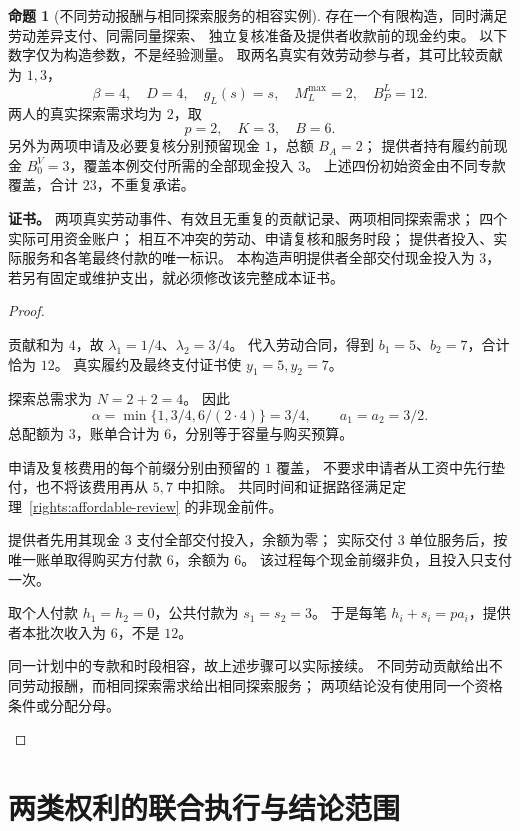 \documentclass[UTF8,12pt,a4paper,openany,fontset=none,zihao=false]{ctexrep}
\theoremstyle{definition}
\newtheorem{proposition}{命题}[chapter]
\newenvironment{certificate}{\par\noindent\textbf{证书。}\ignorespaces}{\par}
\newcommand{\1}{\mathbf 1}
\begin{document}
\begin{proposition}[不同劳动报酬与相同探索服务的相容实例]
\label{access:finite-witness}
存在一个有限构造，同时满足劳动差异支付、同需同量探索、
独立复核准备及提供者收款前的现金约束。
以下数字仅为构造参数，不是经验测量。
取两名真实有效劳动参与者，其可比较贡献为 \(1,3\)，
\[
\beta=4,\quad D=4,\quad g_L(s)=s,\quad
M_L^{\max}=2,\quad B_P^L=12.
\]
两人的真实探索需求均为 \(2\)，取
\[
p=2,\quad K=3,\quad B=6.
\]
另外为两项申请及必要复核分别预留现金 \(1\)，总额 \(B_A=2\)；
提供者持有履约前现金 \(B_0^V=3\)，覆盖本例交付所需的全部现金投入 \(3\)。
上述四份初始资金由不同专款覆盖，合计 \(23\)，不重复承诺。
\end{proposition}
\begin{certificate}
两项真实劳动事件、有效且无重复的贡献记录、两项相同探索需求；
四个实际可用资金账户；
相互不冲突的劳动、申请复核和服务时段；
提供者投入、实际服务和各笔最终付款的唯一标识。
本构造声明提供者全部交付现金投入为 \(3\)，
若另有固定或维护支出，就必须修改该完整成本证书。
\end{certificate}
\begin{proof}
\begin{semanticsteps}
\item 贡献和为 \(4\)，故
\(\lambda_1=1/4\)、\(\lambda_2=3/4\)。
代入劳动合同，得到 \(b_1=5\)、\(b_2=7\)，合计恰为 \(12\)。
真实履约及最终支付证书使 \(y_1=5,y_2=7\)。
\item 探索总需求为 \(N=2+2=4\)。
因此
\[
\alpha=\min\{1,3/4,6/(2\cdot4)\}=3/4,
\qquad a_1=a_2=3/2.
\]
总配额为 \(3\)，账单合计为 \(6\)，分别等于容量与购买预算。
\item 申请及复核费用的每个前缀分别由预留的 \(1\) 覆盖，
不要求申请者从工资中先行垫付，也不将该费用再从 \(5,7\) 中扣除。
共同时间和证据路径满足定理~\ref{rights:affordable-review} 的非现金前件。
\item 提供者先用其现金 \(3\) 支付全部交付投入，余额为零；
实际交付 \(3\) 单位服务后，按唯一账单取得购买方付款 \(6\)，余额为 \(6\)。
该过程每个现金前缀非负，且投入只支付一次。
\item 取个人付款 \(h_1=h_2=0\)，公共付款为 \(s_1=s_2=3\)。
于是每笔 \(h_i+s_i=pa_i\)，提供者本批次收入为 \(6\)，不是 \(12\)。
\item 同一计划中的专款和时段相容，故上述步骤可以实际接续。
不同劳动贡献给出不同劳动报酬，而相同探索需求给出相同探索服务；
两项结论没有使用同一个资格条件或分配分母。
\end{semanticsteps}
\end{proof}

\section{两类权利的联合执行与结论范围}
\end{document}
